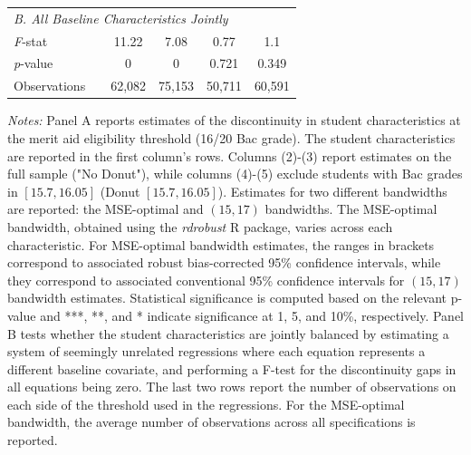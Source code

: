 \begin{table}[!htp]
{{\begin{threeparttable}
\begin{tabular}[t]{lccccc}
\multicolumn{6}{l}{\textit{B. All Baseline Characteristics Jointly}}\\
\hspace{1em}\textit{F}-stat &  & 11.22 & 7.08 & 0.77 & 1.1\\
\hspace{1em}\textit{p}-value &  & 0 & 0 & 0.721 & 0.349\\
\addlinespace[0.3em]\hline\addlinespace[0.3em]
Observations &  & 62,082 & 75,153 & 50,711 & 60,591\\
\bottomrule
\end{tabular}
\begin{tablenotes}[para]
\item \textit{Notes:} Panel A reports estimates of the discontinuity in student characteristics at the merit aid eligibility threshold (16/20 Bac grade). The student characteristics are reported in the first column's rows. Columns (2)-(3) report estimates on the full sample ("No Donut"), while columns (4)-(5) exclude students with Bac grades in $[15.7, 16.05]$ (Donut $[15.7, 16.05]$). Estimates for two different bandwidths are reported: the MSE-optimal and $(15, 17)$ bandwidths. The MSE-optimal bandwidth, obtained using the \textit{rdrobust} R package, varies across each characteristic. For MSE-optimal bandwidth estimates, the ranges in brackets correspond to associated robust bias-corrected 95\% confidence intervals, while they correspond to associated conventional 95\% confidence intervals for $(15, 17)$ bandwidth estimates. Statistical significance is computed based on the relevant p-value and ***, **, and * indicate significance at 1, 5, and 10\%, respectively. Panel B tests whether the student characteristics are jointly balanced by estimating a system of seemingly unrelated regressions where each equation represents a different baseline covariate, and performing a F-test for the discontinuity gaps in all equations being zero. The last two rows report the number of observations on each side of the threshold used in the regressions. For the MSE-optimal bandwidth, the average number of observations across all specifications is reported.
\end{tablenotes}
\end{threeparttable}
}}
\end{table}

